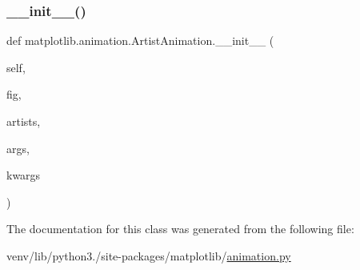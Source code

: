 \subsubsection{\texorpdfstring{\+\_\+\+\_\+init\+\_\+\+\_\+()}{\_\_init\_\_()}}
{\footnotesize\ttfamily def matplotlib.\+animation.\+Artist\+Animation.\+\_\+\+\_\+init\+\_\+\+\_\+ (\begin{DoxyParamCaption}\item[{}]{self,  }\item[{}]{fig,  }\item[{}]{artists,  }\item[{}]{args,  }\item[{}]{kwargs }\end{DoxyParamCaption})}



The documentation for this class was generated from the following file\+:\begin{DoxyCompactItemize}
\item 
venv/lib/python3./site-\/packages/matplotlib/\hyperlink{animation_8py}{animation.\+py}\end{DoxyCompactItemize}

